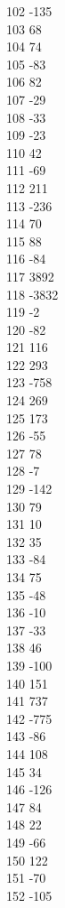 { 102	-135 \\
 103	68 \\
 104	74 \\
 105	-83 \\
 106	82 \\
 107	-29 \\
 108	-33 \\
 109	-23 \\
 110	42 \\
 111	-69 \\
 112	211 \\
 113	-236 \\
 114	70 \\
 115	88 \\
 116	-84 \\
 117	3892 \\
 118	-3832 \\
 119	-2 \\
 120	-82 \\
 121	116 \\
 122	293 \\
 123	-758 \\
 124	269 \\
 125	173 \\
 126	-55 \\
 127	78 \\
 128	-7 \\
 129	-142 \\
 130	79 \\
 131	10 \\
 132	35 \\
 133	-84 \\
 134	75 \\
 135	-48 \\
 136	-10 \\
 137	-33 \\
 138	46 \\
 139	-100 \\
 140	151 \\
 141	737 \\
 142	-775 \\
 143	-86 \\
 144	108 \\
 145	34 \\
 146	-126 \\
 147	84 \\
 148	22 \\
 149	-66 \\
 150	122 \\
 151	-70 \\
 152	-105 \\
}
